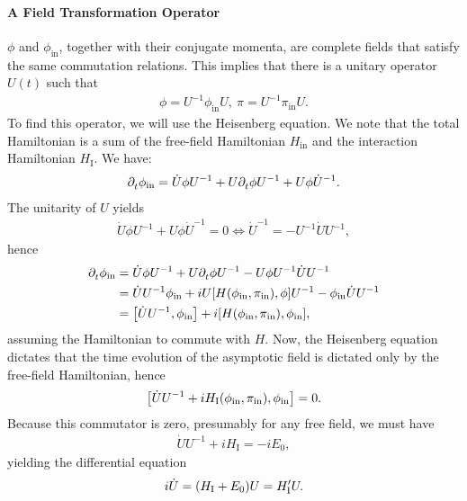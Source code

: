 \paragraph{A Field Transformation Operator}
$\phi$ and $\phi_{\text{in}}$, together with their conjugate momenta, are complete fields that satisfy the same commutation relations. This implies that there is a unitary operator $U(t)$ such that
\begin{align*}
	\phi = U^{-1}\phi_{\text{in}}U,\ \pi = U^{-1}\pi_{\text{in}}U.
\end{align*}
To find this operator, we will use the Heisenberg equation. We note that the total Hamiltonian is a sum of the free-field Hamiltonian $H_{\text{in}}$ and the interaction Hamiltonian $H_{\text{I}}$. We have:
\begin{align*}
	\partial^{}_{t}\phi_{\text{in}} = \dot{U}\phi U^{-1} + U\partial^{}_{t}\phi U^{-1} + U\phi \dot{U}^{-1}.
\end{align*}
The unitarity of $U$ yields
\begin{align*}
	\dot{U}\phi U^{-1} + U\phi\dot{U}^{-1} = 0 \iff \dot{U}^{-1} = -U^{-1}\dot{U}U^{-1},
\end{align*}
hence
\begin{align*}
	\del{}{t}\phi_{\text{in}} &= \dot{U}\phi U^{-1} + U\del{}{t}\phi U^{-1} - U\phi U^{-1}\dot{U}U^{-1} \\
	                          &= \dot{U}U^{-1}\phi_{\text{in}} + iU\comm{H(\phi_{\text{in}}, \pi_{\text{in}})}{\phi} U^{-1} - \phi_{\text{in}}\dot{U}U^{-1} \\
	                          &= \comm{\dot{U}U^{-1}}{\phi_{\text{in}}} + i\comm{H(\phi_{\text{in}}, \pi_{\text{in}})}{\phi_{\text{in}}},
\end{align*}
assuming the Hamiltonian to commute with $H$. Now, the Heisenberg equation dictates that the time evolution of the asymptotic field is dictated only by the free-field Hamiltonian, hence
\begin{align*}
	\comm{\dot{U}U^{-1} + iH_{\text{I}}(\phi_{\text{in}}, \pi_{\text{in}})}{\phi_{\text{in}}} = 0.
\end{align*}
Because this commutator is zero, presumably for any free field, we must have
\begin{align*}
	\dot{U}U^{-1} + iH_{\text{I}} = -iE_{0},
\end{align*}
yielding the differential equation
\begin{align*}
	i\dot{U} = (H_{\text{I}} + E_{0})U = H_{\text{I}}^{\prime} U.
\end{align*}

